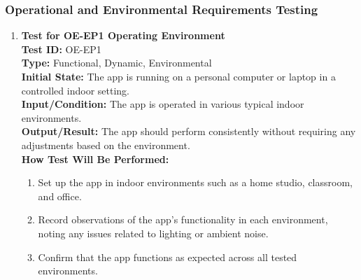 \documentclass[12pt, titlepage]{article}
\begin{document}
\subsubsection{Operational and Environmental Requirements Testing}
\label{OE}
\begin{enumerate}
    \item \textbf{Test for OE-EP1 Operating Environment} \\
      \newline
      \textbf{Test ID:} OE-EP1 \\
      \textbf{Type:} Functional, Dynamic, Environmental \\
      \textbf{Initial State:} The app is running on a personal computer or laptop in a controlled indoor setting. \\
      \textbf{Input/Condition:} The app is operated in various typical indoor environments. \\
      \textbf{Output/Result:} The app should perform consistently without requiring any adjustments based on the environment. \\
      \textbf{How Test Will Be Performed:}
      \begin{enumerate}
          \item Set up the app in indoor environments such as a home studio, classroom, and office.
          \item Record observations of the app's functionality in each environment, noting any issues related to lighting 
          or ambient noise.
          \item Confirm that the app functions as expected across all tested environments.
      \end{enumerate}


\end{enumerate}
\end{document}
